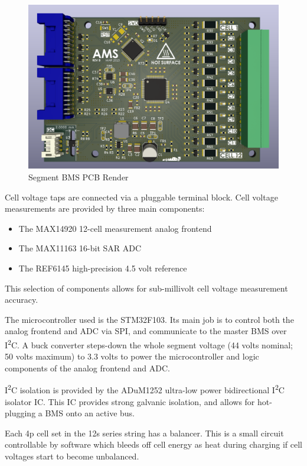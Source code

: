 \documentclass[12pt]{article}
\newcommand{\iic}{I\textsuperscript{2}C}
\begin{document}
\begin{figure}[H]
  \centering
  \includegraphics[width=\linewidth]{bms.png}
  \caption{Segment BMS PCB Render}
  \label{fig:bms-pcb}
\end{figure}

Cell voltage taps are connected via a pluggable terminal block.
Cell voltage measurements are provided by three main components:
\begin{itemize}
\item The MAX14920 12-cell measurement analog frontend
\item The MAX11163 16-bit SAR ADC
\item The REF6145 high-precision 4.5 volt reference
\end{itemize}
This selection of components allows for sub-millivolt cell voltage measurement accuracy.

The microcontroller used is the STM32F103.
Its main job is to control both the analog frontend and ADC via SPI, and communicate to the master BMS over \iic{}.
A buck converter steps-down the whole segment voltage (44 volts nominal; 50 volts maximum) to 3.3 volts to power the microcontroller and logic components of the analog frontend and ADC.

\iic{} isolation is provided by the ADuM1252 ultra-low power bidirectional \iic{} isolator IC.
This IC provides strong galvanic isolation, and allows for hot-plugging a BMS onto an active bus.

Each 4p cell set in the 12s series string has a balancer.
This is a small circuit controllable by software which bleeds off cell energy as heat during charging if cell voltages start to become unbalanced.
\end{document}
